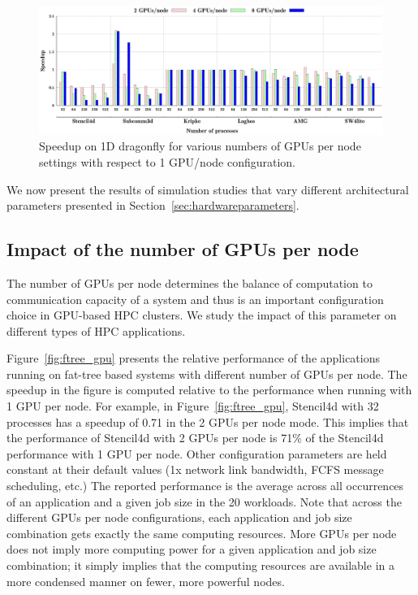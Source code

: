 \begin{figure}[t]
\centering
\includegraphics[width=\textwidth]{plots/dfly/map/dfly-mapping-all.eps}
\caption{Speedup on 1D dragonfly for various numbers of GPUs per node settings with
respect to 1 GPU/node configuration.}
\label{fig:dfly_gpu}
\end{figure}


We now present the results of simulation studies that vary
different architectural parameters presented in
Section~\ref{sec:hardwareparameters}.

\subsection{Impact of the number of GPUs per node}

The number of GPUs per node determines the balance of computation 
to communication capacity of a system and thus is an important configuration
choice in GPU-based HPC clusters. We study
the impact of this parameter on different types of HPC applications.

Figure~\ref{fig:ftree_gpu} presents the relative performance of the applications
running on fat-tree based systems with different number of GPUs per node.  The
speedup in the figure is computed relative to the performance when running with 1 GPU per node.
For example, in Figure~\ref{fig:ftree_gpu}, Stencil4d with 32 processes has a
speedup of 0.71 in the 2 GPUs per node mode. This implies that the performance
of Stencil4d with 2 GPUs per node is 71\% of the Stencil4d performance with 1 GPU
per node.  Other configuration parameters are held constant at their default
values (1x network link bandwidth, FCFS message scheduling, etc.) The
reported performance is the average across all occurrences of an application
and a given job size in the 20 workloads. Note that across the different GPUs per node
configurations, each application and job size combination gets exactly the same computing
resources. More GPUs per node does not imply more computing power for a given
application and job size combination; it simply implies that the computing resources are
available in a more condensed manner on fewer, more powerful nodes.

